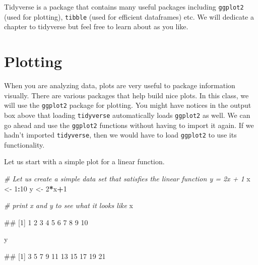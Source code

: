 \documentclass[
]{book}
\newenvironment{Shaded}{\begin{snugshade}}{\end{snugshade}}
\newcommand{\CommentTok}[1]{\textcolor[rgb]{0.56,0.35,0.01}{\textit{#1}}}
\newcommand{\DecValTok}[1]{\textcolor[rgb]{0.00,0.00,0.81}{#1}}
\newcommand{\NormalTok}[1]{#1}
\newcommand{\OtherTok}[1]{\textcolor[rgb]{0.56,0.35,0.01}{#1}}
\newcommand{\SpecialCharTok}[1]{\textcolor[rgb]{0.81,0.36,0.00}{\textbf{#1}}}
\begin{document}
Tidyverse is a package that contains many useful packages including \texttt{ggplot2} (used for plotting), \texttt{tibble} (used for efficient dataframes) etc. We will dedicate a chapter to tidyverse but feel free to learn about as you like.

\hypertarget{plotting}{%
\section{Plotting}\label{plotting}}

When you are analyzing data, plots are very useful to package information visually. There are various packages that help build nice plots. In this class, we will use the \texttt{ggplot2} package for plotting. You might have notices in the output box above that loading \texttt{tidyverse} automatically loads \texttt{ggplot2} as well. We can go ahead and use the \texttt{ggplot2} functions without having to import it again. If we hadn't imported \texttt{tidyverse}, then we would have to load \texttt{ggplot2} to use its functionality.

Let us start with a simple plot for a linear function.

\begin{Shaded}
\begin{Highlighting}[]
\CommentTok{\# Let us create a simple data set that satisfies the linear function y = 2x + 1}
\NormalTok{x }\OtherTok{\textless{}{-}} \DecValTok{1}\SpecialCharTok{:}\DecValTok{10}
\NormalTok{y }\OtherTok{\textless{}{-}} \DecValTok{2}\SpecialCharTok{*}\NormalTok{x}\SpecialCharTok{+}\DecValTok{1}

\CommentTok{\# print x and y to see what it looks like}
\NormalTok{x}
\end{Highlighting}
\end{Shaded}

\begin{Shaded}
\begin{Highlighting}[]
\NormalTok{\#\#  [1]  1  2  3  4  5  6  7  8  9 10}
\end{Highlighting}
\end{Shaded}

\begin{Shaded}
\begin{Highlighting}[]
\NormalTok{y}
\end{Highlighting}
\end{Shaded}

\begin{Shaded}
\begin{Highlighting}[]
\NormalTok{\#\#  [1]  3  5  7  9 11 13 15 17 19 21}
\end{Highlighting}
\end{Shaded}
\end{document}
